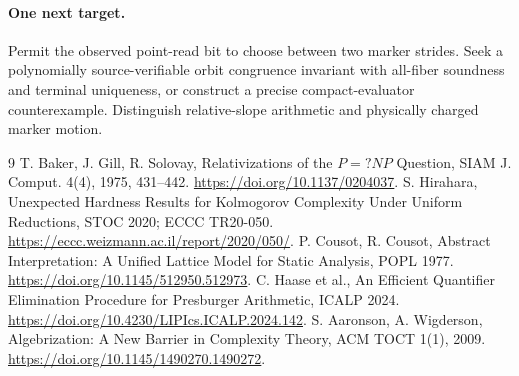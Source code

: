 \documentclass[11pt]{article}
\begin{document}
\paragraph{One next target.}
Permit the observed point-read bit to choose between two marker strides. Seek a polynomially source-verifiable orbit congruence invariant with all-fiber soundness and terminal uniqueness, or construct a precise compact-evaluator counterexample. Distinguish relative-slope arithmetic and physically charged marker motion.

\begin{thebibliography}{9}
 T. Baker, J. Gill, R. Solovay, Relativizations of the $P=?NP$ Question, SIAM J. Comput. 4(4), 1975, 431--442. \url{https://doi.org/10.1137/0204037}.
 S. Hirahara, Unexpected Hardness Results for Kolmogorov Complexity Under Uniform Reductions, STOC 2020; ECCC TR20-050. \url{https://eccc.weizmann.ac.il/report/2020/050/}.
 P. Cousot, R. Cousot, Abstract Interpretation: A Unified Lattice Model for Static Analysis, POPL 1977. \url{https://doi.org/10.1145/512950.512973}.
 C. Haase et al., An Efficient Quantifier Elimination Procedure for Presburger Arithmetic, ICALP 2024. \url{https://doi.org/10.4230/LIPIcs.ICALP.2024.142}.
 S. Aaronson, A. Wigderson, Algebrization: A New Barrier in Complexity Theory, ACM TOCT 1(1), 2009. \url{https://doi.org/10.1145/1490270.1490272}.
\end{thebibliography}
\end{document}
